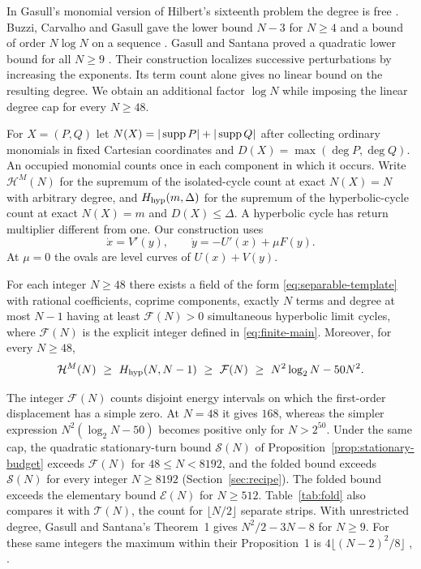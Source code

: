 In Gasull's monomial version of Hilbert's sixteenth problem the degree is free \cite[Problem~8(i)]{GasullProblems}. Buzzi, Carvalho and Gasull gave the lower bound \(N-3\) for \(N\ge4\) and a bound of order \(N\log N\) on a sequence \cite[Theorem~1.2]{BuzziCarvalhoGasull2021}. Gasull and Santana proved a quadratic lower bound for all \(N\ge9\) \cite[Theorem~1]{GasullSantana2024}. Their construction localizes successive perturbations by increasing the exponents. Its term count alone gives no linear bound on the resulting degree. We obtain an additional factor \(\log N\) while imposing the linear degree cap for every \(N\ge48\).

For \(X=(P,Q)\) let \(N(X)=|\operatorname{supp} P|+|\operatorname{supp} Q|\) after collecting ordinary monomials in fixed Cartesian coordinates and \(D(X)=\max(\deg P,\deg Q)\). An occupied monomial counts once in each component in which it occurs. Write \(\mathcal H^M(N)\) for the supremum of the isolated-cycle count at exact \(N(X)=N\) with arbitrary degree, and \(H_{\mathrm{hyp}}(m,\Delta)\) for the supremum of the hyperbolic-cycle count at exact \(N(X)=m\) and \(D(X)\le\Delta\). A hyperbolic cycle has return multiplier different from one. Our construction uses
\begin{equation}\label{eq:separable-template}
 \dot x=V'(y),\qquad \dot y=-U'(x)+\mu F(y).
\end{equation}
At \(\mu=0\) the ovals are level curves of \(U(x)+V(y)\).

\begin{theorem}\label{cor:linear-cap}
For each integer \(N\ge48\) there exists a field of the form \eqref{eq:separable-template} with rational coefficients, coprime components, exactly \(N\) terms and degree at most \(N-1\) having at least \(\mathcal F(N)>0\) simultaneous hyperbolic limit cycles, where \(\mathcal F(N)\) is the explicit integer defined in \eqref{eq:finite-main}. Moreover, for every \(N\ge48\),
\[
 \mathcal H^M(N)\ \ge\ \Hhyp(N,N-1)\ \ge\ \mathcal F(N)
       \ \ge\ N^2\log_2N-50N^2 .
\]
\end{theorem}

The integer \(\mathcal F(N)\) counts disjoint energy intervals on which the first-order displacement has a simple zero. At \(N=48\) it gives \(168\), whereas the simpler expression \(N^2(\log_2N-50)\) becomes positive only for \(N>2^{50}\). Under the same cap, the quadratic stationary-turn bound \(\mathcal S(N)\) of Proposition~\ref{prop:stationary-budget} exceeds \(\mathcal F(N)\) for \(48\le N<8192\), and the folded bound exceeds \(\mathcal S(N)\) for every integer \(N\ge8192\) (Section~\ref{sec:recipe}). The folded bound exceeds the elementary bound \(\mathcal E(N)\) for \(N\ge512\). Table~\ref{tab:fold} also compares it with \(\mathcal T(N)\), the count for \(\lfloor N/2\rfloor\) separate strips. With unrestricted degree, Gasull and Santana's Theorem~1 gives \(N^2/2-3N-8\) for \(N\ge9\). For these same integers the maximum within their Proposition~1 is \(4\lfloor(N-2)^2/8\rfloor\) \cite{GasullSantana2024}, \cite[\S{}]{LuElectronic}.

